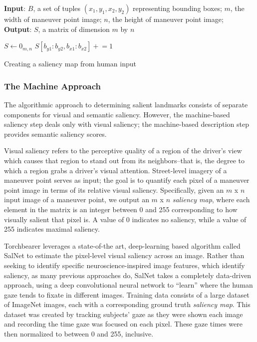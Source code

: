\begin{algorithm}[htbp]
\textbf{Input}: $B$, a set of tuples $(x_1, y_1, x_2, y_2)$ representing bounding boxes;
$m$, the width of maneuver point image;
$n$, the height of maneuver point image; \\
\textbf{Output}: $S$, a matrix of dimension $m$ by $n$ 
\begin{algorithmic}[1]
\STATE $S\gets 0_{m,n}$
    \STATE $S[b_{y1}:b_{y2}, b_{x1}:b_{x2}] \mathrel{+}= 1$
\ENDFOR
{}
\end{algorithmic}
\caption{Creating a saliency map from human input}\label{alg:saliencyMap}
\label{alg:saliencyMap}
\end{algorithm} 

\subsubsection{The Machine Approach}
The algorithmic approach to determining salient landmarks consists of separate components for visual and semantic saliency. However, the machine-based saliency step deals only with visual saliency; the machine-based description step provides semantic saliency scores.

Visual saliency refers to the perceptive quality of a region of the driver’s view which causes that region to stand out from its neighbors--that is, the degree to which a region grabs a driver’s visual attention. Street-level imagery of a maneuver point serves as input; the goal is to quantify each pixel of a maneuver point image in terms of its relative visual saliency. Specifically, given an $m$ x $n$ input image of a maneuver point, we output an $m$ x $n$ \textit{saliency map}, where each element in the matrix is an integer between 0 and 255 corresponding to how visually salient that pixel is. A value of 0 indicates no saliency, while a value of 255 indicates maximal saliency.

Torchbearer leverages a state-of-the art, deep-learning based algorithm called SalNet \cite{Pan_2016_CVPR} to estimate the pixel-level visual saliency across an image. Rather than seeking to identify specific neuroscience-inspired image features, which identify saliency, as many previous approaches do, SalNet takes a completely data-driven approach, using a deep convolutional neural network to “learn” where the human gaze tends to fixate in different images. Training data consists of a large dataset of ImageNet \cite{imagenet_cvpr09} images, each with a corresponding ground truth \textit{saliency map}. This dataset was created by tracking subjects' gaze as they were shown each image and recording the time gaze was focused on each pixel. These gaze times were then normalized to between 0 and 255, inclusive.

